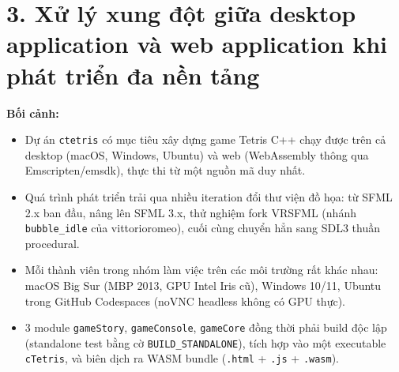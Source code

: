 \documentclass[12pt,a4paper]{article}
\begin{document}
\section*{3. Xử lý xung đột giữa desktop application và web application khi phát triển đa nền tảng}

\textbf{Bối cảnh:}
\begin{itemize}
    \item Dự án \texttt{ctetris} có mục tiêu xây dựng game Tetris C++ chạy được trên cả desktop (macOS, Windows, Ubuntu) và web (WebAssembly thông qua Emscripten/emsdk), thực thi từ một nguồn mã duy nhất.
    \item Quá trình phát triển trải qua nhiều iteration đổi thư viện đồ họa: từ SFML 2.x ban đầu, nâng lên SFML 3.x, thử nghiệm fork VRSFML (nhánh \texttt{bubble\_idle} của vittorioromeo), cuối cùng chuyển hẳn sang SDL3 thuần procedural.
    \item Mỗi thành viên trong nhóm làm việc trên các môi trường rất khác nhau: macOS Big Sur (MBP 2013, GPU Intel Iris cũ), Windows 10/11, Ubuntu trong GitHub Codespaces (noVNC headless không có GPU thực).
    \item 3 module \texttt{gameStory}, \texttt{gameConsole}, \texttt{gameCore} đồng thời phải build độc lập (standalone test bằng cờ \texttt{BUILD\_STANDALONE}), tích hợp vào một executable \texttt{cTetris}, và biên dịch ra WASM bundle (\texttt{.html} + \texttt{.js} + \texttt{.wasm}).
\end{itemize}
\end{document}
